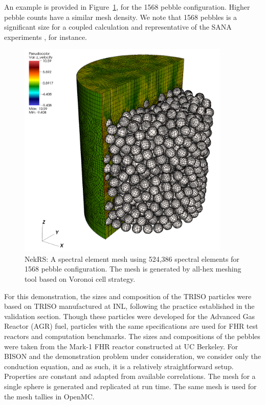 An example is provided in Figure~\ref{f:ndemo1}, for the 1568
pebble configuration. Higher pebble counts have a similar mesh density.
We note that 1568 pebbles is a significant size for a coupled calculation and
representative of the SANA experiments \cite{zou2017validation}, for instance.

\begin{figure}[!h]
\centering
\includegraphics[clip=true,width=0.9\textwidth]{Figures/ndemo_r1}
\caption{NekRS: A spectral element mesh using 524,386 spectral elements for 1568 pebble configuration.
         The mesh is generated by all-hex meshing tool based on Voronoi cell strategy.}
\label{f:ndemo1}
\end{figure}

For this demonstration, the sizes and composition of the TRISO particles were based on TRISO manufactured at INL, following the practice established in the validation section. Though these particles were developed for the Advanced Gas Reactor (AGR) fuel, particles with the same specifications are used for FHR test reactors and computation benchmarks. The sizes and compositions of the pebbles were taken from the Mark-1 FHR reactor constructed at UC Berkeley. For BISON and the demonstration problem under consideration, we consider only the conduction equation, and as such, it is a relatively straightforward setup. Properties are constant and adapted from available correlations. The mesh for a single sphere is generated and replicated at run time. The same mesh is used for the mesh tallies in OpenMC.

